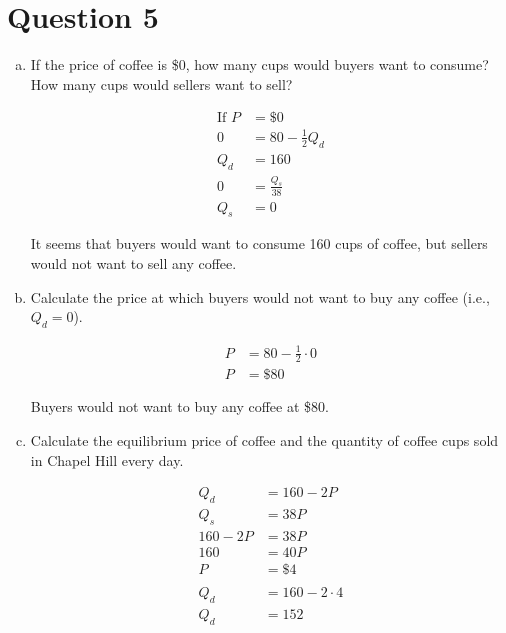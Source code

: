 \documentclass{article}
\newcommand{\question}[1]{\pagebreak\section{Question #1}}
\begin{document}
\begin{enumerate}[(a)]

\end{enumerate}

\question{5}
\begin{enumerate}[(a)]
    \item If the price of coffee is \$0, how many cups would buyers want to
consume? How many cups would sellers want to sell?

    \begin{align*}
        \text{If } P &= \$0\\
        0 &= 80 - \frac{1}{2}Q_d\\
        Q_d &= 160\\
        0 &= \frac{Q_s}{38}\\
        Q_s &= 0
    \end{align*}

It seems that buyers would want to consume 160 cups of coffee, but sellers would not want to sell any coffee.

    \item Calculate the price at which buyers would not want to buy any
coffee (i.e., \(Q_d = 0\)).

    \begin{align*}
        P &= 80 - \frac{1}{2}\cdot0\\
        P &= \$80
    \end{align*}

    Buyers would not want to buy any coffee at \$80.

    \item Calculate the equilibrium price of coffee and the quantity of coffee cups sold in Chapel Hill every day.
    
    \begin{align*}
        Q_d &= 160-2P\\
        Q_s &= 38P\\
        160-2P &= 38P\\
        160 &= 40P\\
        P &= \$4\\
        \\
        Q_d &= 160-2\cdot4\\
        Q_d &= 152
    \end{align*}


\end{enumerate}
\end{document}
